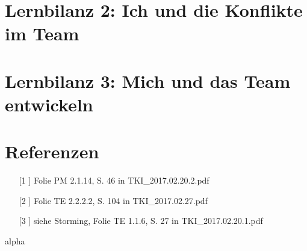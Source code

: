 \documentclass[11pt,twoside]{hsrthesis}
\begin{document}
\chapter{Lernbilanz 2: Ich und die Konflikte im Team}

\chapter{Lernbilanz 3: Mich und das Team entwickeln} 

\chapter{Referenzen}

\begin{itemize}
\item[[1]] Folie PM	2.1.14, S. 46 in TKI{\_}2017.02.20.2.pdf
\item[[2]] Folie TE 2.2.2.2, S. 104 in TKI{\_}2017.02.27.pdf
\item[[3]] siehe Storming, Folie TE 1.1.6, S. 27 in TKI{\_}2017.02.20.1.pdf
\end{itemize}
 

 {alpha}



 
\end{document}
